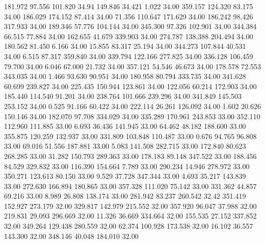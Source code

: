  181.972   97.556  101.820        34.94
 149.846   34.421    1.022        34.00
 359.157  124.320   83.175        34.00
 186.029  174.152   87.414        34.00
  71.356  110.647  171.629        34.00
 186.242   98.426  317.933        34.00
 189.346   57.776  104.144        34.00
 345.300   97.326  102.901        34.00
 344.384   66.515   77.884        34.00
 162.655   41.679  339.903        34.00
 274.787  138.388  204.494        34.00
 180.562   81.450    6.166        34.00
  15.855   83.317   25.194        34.00
 344.273  107.844   40.531        34.00
   6.515   87.317  359.840        34.00
 339.794  122.166  277.825        34.00
 336.128  106.459   79.700        34.00
   6.046   67.000   21.732        34.00
 357.121   54.546   46.673        34.00
 178.578   72.553  343.035        34.00
   1.466   93.630   90.951        34.00
 180.958   80.794  333.735        34.00
 341.628   60.699  239.827        34.00
 225.435  150.944  123.861        34.00
 122.056   60.214  172.903        34.00
 185.440  114.540   91.201        34.00
 238.764  101.666  239.296        34.00
 341.849  145.503  253.152        34.00
   0.525   91.166   60.422        34.00
 222.114   26.261  126.092        34.00
   1.602   20.626  150.146        34.00
 182.070   97.708  334.029        34.00
 335.289  170.961  243.853        33.00
 352.110  112.960  111.885        33.00
   6.693   36.436  141.945        33.00
  64.462   48.182  188.600        33.00
 355.875  120.259  132.937        33.00
 331.809  103.848  110.487        33.00
   0.676   94.765   96.808        33.00
  69.016   51.556  187.881        33.00
   5.083  141.508  282.715        33.00
 172.840   80.623  268.285        33.00
  31.282  150.793  289.363        33.00
 178.183   89.148  347.522        33.00
 188.456   84.529  329.832        33.00
 116.390  154.664    7.789        33.00
 290.234   14.946  278.972        33.00
 350.271  123.613   80.150        33.00
   9.529   37.728  347.344        33.00
   4.693   35.217  143.839        33.00
 272.630  166.894  180.865        33.00
 357.328  111.020   75.142        33.00
 331.362   44.857   69.216        33.00
   8.989   26.808  138.174        33.00
 281.942   83.237  260.542        32.42
 351.419  152.927  273.179        32.00
 329.817  142.979  215.552        32.00
 357.920   96.047   37.988        32.00
 219.831   29.093  296.669        32.00
  11.326   36.669  334.664        32.00
 155.535   27.152  337.852        32.00
 349.264  129.438  280.559        32.00
  62.374  100.928  173.538        32.00
  16.102   36.557  143.300        32.00
 348.146   40.048  184.010        32.00
